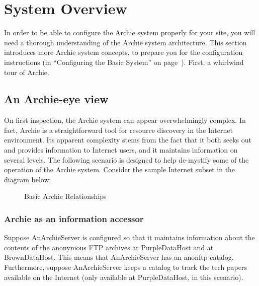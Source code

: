 %
%
%
%




\chapter{System Overview}
\label{chap:overview}

In order to be able to configure the Archie system properly for your site, you
will need a thorough understanding of the Archie system architecture. This
section introduces more Archie system concepts, to prepare you for the
configuration instructions (in ``Configuring the Basic System'' on
page~\pageref{chap:configure}). First, a whirlwind tour of Archie.

\section{An Archie-eye view}


On first inspection, the Archie system can appear overwhelmingly complex. In
fact, Archie is a straightforward tool for resource discovery in the Internet
environment. Its apparent complexity stems from the fact that it both seeks
out and provides information to Internet users, and it maintains information
on several levels. The following scenario is designed to help de-mystify some
of the operation of the Archie system.
Consider the sample Internet subset in the diagram below:

\begin{figure}[!h]
\begin{center}
\end{center}
\caption{Basic Archie Relationships}
\end{figure}

%
%
%
\subsection{Archie as an information accessor}

Suppose AnArchieServer is configured so that it maintains information about
the contents of the anonymous FTP archives at PurpleDataHost and at
BrownDataHost. This means that AnArchieServer has an anonftp
catalog. Furthermore, suppose AnArchieServer keeps a catalog to track the
tech papers available on the Internet (only available at PurpleDataHost, in
this scenario).

